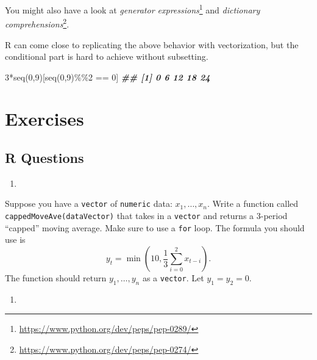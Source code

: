 \documentclass[
  12pt,
  krantz2]{krantz}
\makeatletter
\newenvironment{Shaded}{\begin{snugshade}}{\end{snugshade}}
\newcommand{\DecValTok}[1]{\textcolor[rgb]{0.06,0.06,0.06}{#1}}
\newcommand{\DocumentationTok}[1]{\textcolor[rgb]{0.37,0.37,0.37}{\textbf{\textit{#1}}}}
\newcommand{\FunctionTok}[1]{\textcolor[rgb]{0,0,0}{#1}}
\newcommand{\NormalTok}[1]{#1}
\newcommand{\SpecialCharTok}[1]{\textcolor[rgb]{0,0,0}{#1}}
\providecommand{\tightlist}{%
  \setlength{\itemsep}{0pt}\setlength{\parskip}{0pt}}
\renewcommand{\href}[2]{#2\footnote{\url{#1}}}
\newenvironment{kframe}{%
\medskip{}
\setlength{\fboxsep}{.8em}
 \def\at@end@of@kframe{}%
 \ifinner\ifhmode%
  \def\at@end@of@kframe{\end{minipage}}%
  \begin{minipage}{\columnwidth}%
 \fi\fi%
 \def\FrameCommand##1{\hskip\@totalleftmargin \hskip-\fboxsep
 \colorbox{shadecolor}{##1}\hskip-\fboxsep
     \hskip-\linewidth \hskip-\@totalleftmargin \hskip\columnwidth}%
 \MakeFramed {\advance\hsize-\width
   \@totalleftmargin\z@ \linewidth\hsize
   \@setminipage}}%
 {\par\unskip\endMakeFramed%
 \at@end@of@kframe}
\renewenvironment{Shaded}{\begin{kframe}}{\end{kframe}}
\makeatother
\begin{document}
You might also have a look at \href{https://www.python.org/dev/peps/pep-0289/}{\emph{generator expressions}} and \href{https://www.python.org/dev/peps/pep-0274/}{\emph{dictionary comprehensions}}.

R can come close to replicating the above behavior with vectorization, but the conditional part is hard to achieve without subsetting.

\begin{Shaded}
\begin{Highlighting}[]
\DecValTok{3}\SpecialCharTok{*}\FunctionTok{seq}\NormalTok{(}\DecValTok{0}\NormalTok{,}\DecValTok{9}\NormalTok{)[}\FunctionTok{seq}\NormalTok{(}\DecValTok{0}\NormalTok{,}\DecValTok{9}\NormalTok{)}\SpecialCharTok{\%\%}\DecValTok{2} \SpecialCharTok{==} \DecValTok{0}\NormalTok{]}
\DocumentationTok{\#\# [1]  0  6 12 18 24}
\end{Highlighting}
\end{Shaded}

\hypertarget{exercises-9}{%
\section{Exercises}\label{exercises-9}}

\hypertarget{r-questions-8}{%
\subsection{R Questions}\label{r-questions-8}}

\begin{enumerate}
\def\labelenumi{\arabic{enumi}.}
\tightlist
\item
\end{enumerate}

Suppose you have a \texttt{vector} of \texttt{numeric} data: \(x_1, \ldots, x_n\). Write a function called \texttt{cappedMoveAve(dataVector)} that takes in a \texttt{vector} and returns a 3-period ``capped'' moving average. Make sure to use a \texttt{for} loop. The formula you should use is
\[
y_t = \min\left(10, \frac{1}{3}\sum_{i=0}^2x_{t-i} \right).
\]
The function should return \(y_1, \ldots, y_n\) as a \texttt{vector}. Let \(y_1 = y_2 = 0\).

\begin{enumerate}
\def\labelenumi{\arabic{enumi}.}
\setcounter{enumi}{1}
\tightlist
\item
\end{enumerate}
\end{document}
